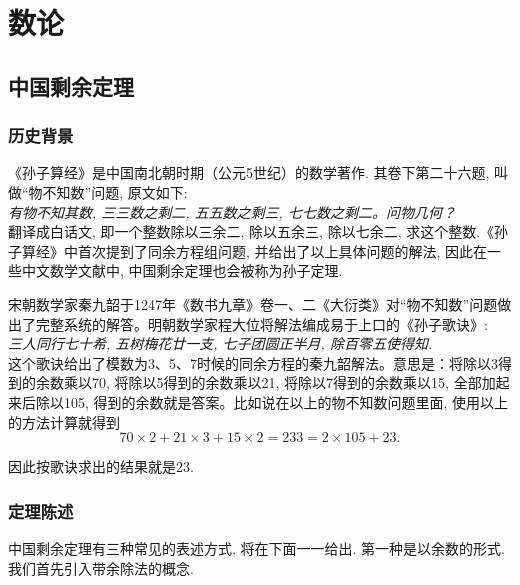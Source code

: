 \documentclass[color=green,mathpazo,titlestyle=hang]{elegantbook}
\author{Hooy}
\begin{document}
\maketitle
\tableofcontents
\mainmatter

\chapter{数论}

\section{中国剩余定理}

\subsection{历史背景}
《孙子算经》是中国南北朝时期（公元5世纪）的数学著作\cite{szsj}. 其卷下第二十六题, 叫做“物不知数”问题, 原文如下:\\ 

\emph{有物不知其数, 三三数之剩二, 五五数之剩三, 七七数之剩二。问物几何？}\\ 


翻译成白话文, 即一个整数除以三余二, 除以五余三, 除以七余二, 求这个整数.《孙子算经》中首次提到了同余方程组问题, 并给出了以上具体问题的解法, 因此在一些中文数学文献中, 中国剩余定理也会被称为孙子定理.

宋朝数学家秦九韶于1247年《数书九章》卷一、二《大衍类》对“物不知数”问题做出了完整系统的解答。明朝数学家程大位将解法编成易于上口的《孙子歌诀》\cite{szgj}:\\ 

\emph{三人同行七十希, 五树梅花廿一支, 七子团圆正半月, 除百零五使得知.}\\

这个歌诀给出了模数为3、5、7时候的同余方程的秦九韶解法。意思是：将除以3得到的余数乘以70, 将除以5得到的余数乘以21, 将除以7得到的余数乘以15, 全部加起来后除以105, 得到的余数就是答案。比如说在以上的物不知数问题里面, 使用以上的方法计算就得到
\[ 70\times 2+21\times 3+15\times 2=233=2\times 105+23.\] 

因此按歌诀求出的结果就是23.



\subsection{定理陈述}
  中国剩余定理有三种常见的表述方式, 将在下面一一给出.
  第一种是以余数的形式.我们首先引入带余除法的概念.
  
\end{document}
